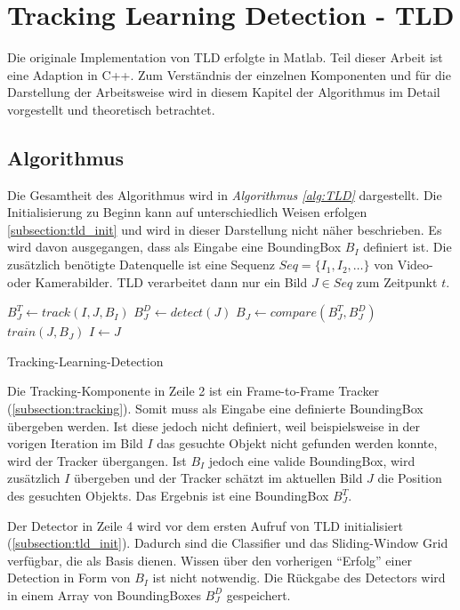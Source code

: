 \section{Tracking Learning Detection - TLD}
	Die originale Implementation von TLD erfolgte in Matlab. Teil dieser Arbeit ist eine Adaption in C++. Zum Verständnis der einzelnen Komponenten und für die Darstellung der Arbeitsweise wird in diesem Kapitel der Algorithmus im Detail vorgestellt und theoretisch betrachtet.

	\subsection{Algorithmus}
	Die Gesamtheit des Algorithmus wird in {\em Algorithmus \ref{alg:TLD}} dargestellt. Die Initialisierung zu Beginn kann auf unterschiedlich Weisen erfolgen \ref{subsection:tld_init} und wird in dieser Darstellung nicht näher beschrieben. Es wird davon ausgegangen, dass als Eingabe eine BoundingBox $B_I$ definiert ist. Die zusätzlich benötigte Datenquelle ist eine Sequenz $Seq = \{I_1, I_2, \dots \}$ von Video- oder Kamerabilder. TLD verarbeitet dann nur ein Bild $J \in Seq$ zum Zeitpunkt $t$.

	\begin{algorithm}[H]
		\vspace{0.2cm}
		 {
			$B_J^T \leftarrow track(I,J,B_I)$\;
		}
		$B_J^D \leftarrow detect(J)$\;
		$B_J \leftarrow compare(B_J^T,B_J^D)$\;
		 {
			$train(J,B_J)$\;
		}
		$I \leftarrow J$\;
		\caption{Tracking-Learning-Detection}
		\label{alg:TLD}
		\vspace{0.2cm}
	\end{algorithm}
	Die Tracking-Komponente in Zeile 2 ist ein Frame-to-Frame Tracker (\ref{subsection:tracking}). Somit muss als Eingabe eine definierte BoundingBox übergeben werden. Ist diese jedoch nicht definiert, weil beispielsweise in der vorigen Iteration im Bild $I$ das gesuchte Objekt nicht gefunden werden konnte, wird der Tracker übergangen. Ist $B_I$ jedoch eine valide BoundingBox, wird zusätzlich $I$ übergeben und der Tracker schätzt im aktuellen Bild $J$ die Position des gesuchten Objekts. Das Ergebnis ist eine BoundingBox $B_J^T$.

	Der Detector in Zeile 4 wird vor dem ersten Aufruf von TLD initialisiert (\ref{subsection:tld_init}). Dadurch sind die Classifier und das Sliding-Window Grid verfügbar, die als Basis dienen. Wissen über den vorherigen ``Erfolg'' einer Detection in Form von $B_I$ ist nicht notwendig. Die Rückgabe des Detectors wird in einem Array von BoundingBoxes $B_J^D$ gespeichert.

